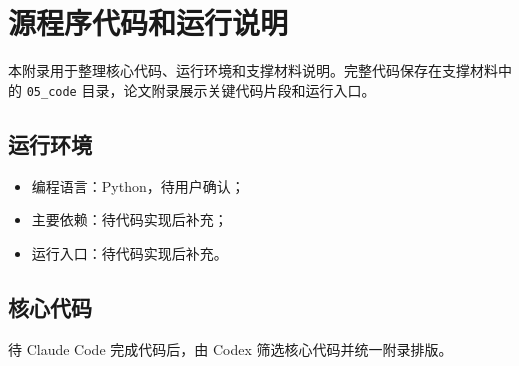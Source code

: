 \section{源程序代码和运行说明}

本附录用于整理核心代码、运行环境和支撑材料说明。完整代码保存在支撑材料中的 \texttt{05\_code} 目录，论文附录展示关键代码片段和运行入口。

\subsection{运行环境}

\begin{itemize}
  \item 编程语言：Python，待用户确认；
  \item 主要依赖：待代码实现后补充；
  \item 运行入口：待代码实现后补充。
\end{itemize}

\subsection{核心代码}

待 Claude Code 完成代码后，由 Codex 筛选核心代码并统一附录排版。
